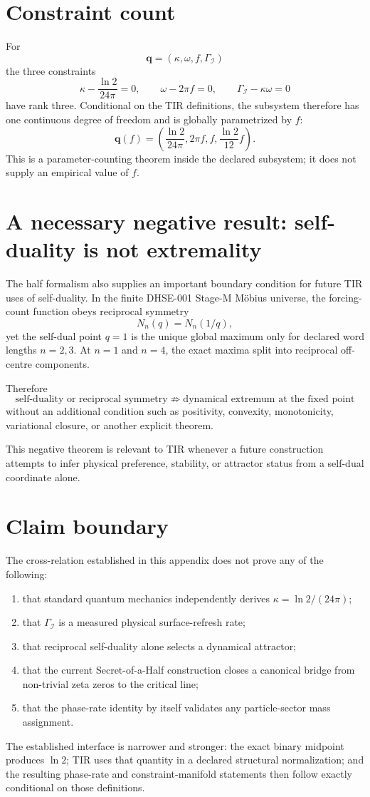 \section{Constraint count}

For
\[
\mathbf q=(\kappa,\omega,f,\Gamma_{\mathcal I})
\]
the three constraints
\[
\kappa-\frac{\ln2}{24\pi}=0,
\qquad
\omega-2\pi f=0,
\qquad
\Gamma_{\mathcal I}-\kappa\omega=0
\]
have rank three.  Conditional on the TIR definitions, the subsystem therefore
has one continuous degree of freedom and is globally parametrized by $f$:
\[
\mathbf q(f)=
\left(
\frac{\ln2}{24\pi},
2\pi f,
f,
\frac{\ln2}{12}f
\right).
\]
This is a parameter-counting theorem inside the declared subsystem; it does not
supply an empirical value of $f$.

\section{A necessary negative result: self-duality is not extremality}

The half formalism also supplies an important boundary condition for future TIR
uses of self-duality.  In the finite DHSE-001 Stage-M M\"obius universe, the
forcing-count function obeys reciprocal symmetry
\[
N_n(q)=N_n(1/q),
\]
yet the self-dual point $q=1$ is the unique global maximum only for declared word
lengths $n=2,3$.  At $n=1$ and $n=4$, the exact maxima split into reciprocal
off-centre components.

Therefore
\begin{equation}
\boxed{
\text{self-duality or reciprocal symmetry}
\;\not\Rightarrow\;
\text{dynamical extremum at the fixed point}
}
\label{eq:self-duality-not-extremality}
\end{equation}
without an additional condition such as positivity, convexity, monotonicity,
variational closure, or another explicit theorem.

This negative theorem is relevant to TIR whenever a future construction attempts
to infer physical preference, stability, or attractor status from a self-dual
coordinate alone.

\section{Claim boundary}

The cross-relation established in this appendix does not prove any of the
following:
\begin{enumerate}
\item that standard quantum mechanics independently derives
      $\kappa=\ln2/(24\pi)$;
\item that $\Gamma_{\mathcal I}$ is a measured physical surface-refresh rate;
\item that reciprocal self-duality alone selects a dynamical attractor;
\item that the current Secret-of-a-Half construction closes a canonical bridge
      from non-trivial zeta zeros to the critical line;
\item that the phase-rate identity by itself validates any particle-sector mass
      assignment.
\end{enumerate}

The established interface is narrower and stronger: the exact binary midpoint
produces $\ln2$; TIR uses that quantity in a declared structural normalization;
and the resulting phase-rate and constraint-manifold statements then follow
exactly conditional on those definitions.
